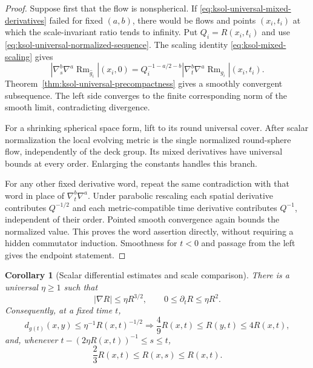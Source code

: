 \documentclass[10pt]{coll-l}
\newtheorem{corollary}[theorem]{Corollary}
\theoremstyle{definition}
\theoremstyle{remark}
\numberwithin{section}{chapter}
\numberwithin{equation}{chapter}
\newcommand{\Rm}{\operatorname{Rm}}
\begin{document}
\begin{proof}
Suppose first that the flow is nonspherical.  If
\eqref{eq:ksol-universal-mixed-derivatives} failed for fixed $(a,b)$, there
would be flows and points $(x_i,t_i)$ at which the scale-invariant ratio
tends to infinity.  Put $Q_i=R(x_i,t_i)$ and use
\eqref{eq:ksol-universal-normalized-sequence}.  The scaling identity
\eqref{eq:ksol-mixed-scaling} gives
\begin{equation}
 \left|\nabla_s^b\nabla^a\Rm_{\widehat g_i}\right|(x_i,0)
 =Q_i^{-1-a/2-b}
   \left|\nabla_t^b\nabla^a\Rm_{g_i}\right|(x_i,t_i).  \label{eq:ksol-derivative-normalized-ratio}
\end{equation}
Theorem~\ref{thm:ksol-universal-precompactness} gives a smoothly convergent
subsequence.  The left side converges to the finite corresponding norm of
the smooth limit, contradicting divergence.

For a shrinking spherical space form, lift to its round universal cover.
After scalar normalization the local evolving metric is the single
normalized round-sphere flow, independently of the deck group.  Its mixed
derivatives have universal bounds at every order.  Enlarging the constants
handles this branch.

For any other fixed derivative word, repeat the same contradiction with
that word in place of $\nabla_t^b\nabla^a$.  Under parabolic rescaling each
spatial derivative contributes $Q^{-1/2}$ and each metric-compatible time
derivative contributes $Q^{-1}$, independent of their order.  Pointed
smooth convergence again bounds the normalized value.  This proves the
word assertion directly, without requiring a hidden commutator induction.
Smoothness for $t<0$ and passage from the left gives the endpoint statement.
\end{proof}

\begin{corollary}[Scalar differential estimates and scale comparison]
\label{cor:ksol-scalar-scale-comparison}
There is a universal $\eta\geq1$ such that
\begin{equation}
       |\nabla R|\leq\eta R^{3/2},
       \qquad 0\leq\partial_tR\leq\eta R^2.            \label{eq:ksol-scalar-differential-estimates}
\end{equation}
Consequently, at a fixed time $t$,
\begin{equation}
 d_{g(t)}(x,y)\leq\eta^{-1}R(x,t)^{-1/2}
 \Longrightarrow
 \frac49R(x,t)\leq R(y,t)\leq4R(x,t),                 \label{eq:ksol-spatial-scale-comparison}
\end{equation}
and, whenever
$t-(2\eta R(x,t))^{-1}\leq s\leq t$,
\begin{equation}
                  \frac23R(x,t)\leq R(x,s)\leq R(x,t).\label{eq:ksol-temporal-scale-comparison}
\end{equation}
\end{corollary}
\end{document}
